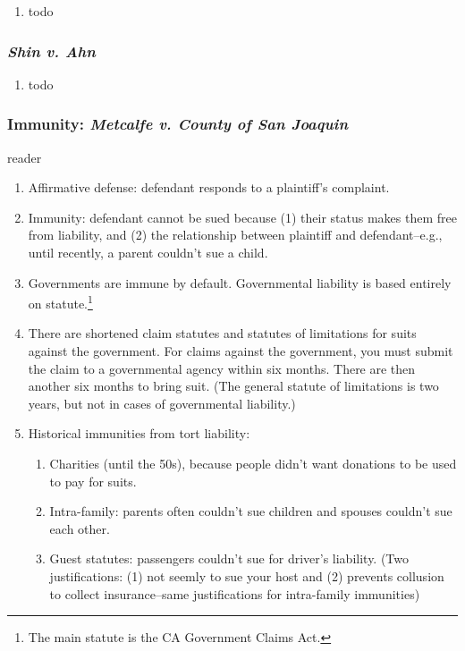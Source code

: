 \begin{enumerate}
\item todo
\end{enumerate}

\subsubsection{\emph{Shin v. Ahn}} %

\begin{enumerate}
    \item todo
\end{enumerate}

\subsubsection{Immunity: \emph{Metcalfe v. County of San Joaquin}} %
reader

\begin{enumerate}
    \item Affirmative defense: defendant responds to a plaintiff's complaint.
    \item Immunity: defendant cannot be sued because (1) their status makes them free from liability, and (2) the relationship between plaintiff and defendant--e.g., until recently, a parent couldn't sue a child.
    \item Governments are immune by default. Governmental liability is based entirely on statute.\footnote{The main statute is the CA Government Claims Act.}
    \item There are shortened claim statutes and statutes of limitations for suits against the government. For claims against the government, you must submit the claim to a governmental agency within six months. There are then another six months to bring suit. (The general statute of limitations is two years, but not in cases of governmental liability.)
    \item Historical immunities from tort liability:
    \begin{enumerate}
        \item Charities (until the 50s), because people didn't want donations to be used to pay for suits.
        \item Intra-family: parents often couldn't sue children and spouses couldn't sue each other.
        \item Guest statutes: passengers couldn't sue for driver's liability. (Two justifications: (1) not seemly to sue your host and (2) prevents collusion to collect insurance--same justifications for intra-family immunities)
    \end{enumerate}
\end{enumerate}
